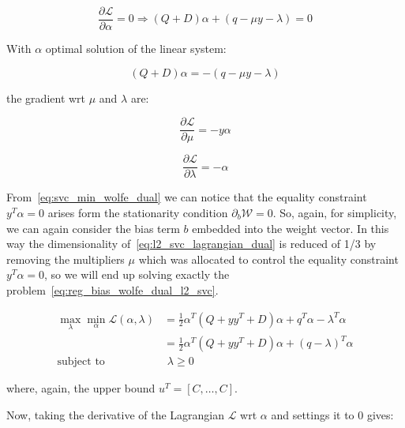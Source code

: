\begin{equation} \label{eq:l2_svc_lagrangian_der_a}
	\frac{\partial \mathcal{L}}{\partial \alpha}=0\Rightarrow (Q+D) \alpha + (q - \mu y - \lambda) = 0
\end{equation}

With $\alpha$ optimal solution of the linear system:

\begin{equation} \label{eq:l2_svc_lagrangian_sol}
    (Q+D) \alpha = - (q - \mu y - \lambda)
\end{equation}

the gradient wrt $\mu$ and $\lambda$ are:

\begin{equation} \label{eq:l2_svc_lagrangian_der_mu}
	\frac{\partial \mathcal{L}}{\partial \mu}=-y \alpha
\end{equation}

\begin{equation} \label{eq:l2_svc_lagrangian_der_lambda}
    \frac{\partial \mathcal{L}}{\partial \lambda}=-\alpha
\end{equation}

From~\eqref{eq:svc_min_wolfe_dual} we can notice that the equality constraint $y^T \alpha = 0$ arises form the stationarity condition $\partial_{{b}} \mathcal{W}=0$. So, again, for simplicity, we can again consider the bias term $b$ embedded into the weight vector. In this way the dimensionality of~\eqref{eq:l2_svc_lagrangian_dual} is reduced of 1/3 by removing the multipliers $\mu$ which was allocated to control the equality constraint $y^T \alpha=0$, so we will end up solving exactly the problem~\eqref{eq:reg_bias_wolfe_dual_l2_svc}.

\begin{equation} \label{eq:l2_svc_lb_lagrangian_dual}
	\begin{aligned}
    	\max_{\lambda} \min_{\alpha} \mathcal{L}(\alpha,\lambda) &= \frac{1}{2} \alpha^T (Q + yy^T + D) \alpha+q^T\alpha - \lambda^T \alpha \\
    &= \frac{1}{2} \alpha^T (Q + yy^T + D) \alpha + (q - \lambda)^T \alpha \\
    \text{subject to} \quad & \,\, \lambda \geq 0
	\end{aligned}
\end{equation}

where, again, the upper bound $u^T = [C, \dots, C]$.

Now, taking the derivative of the Lagrangian $\mathcal{L}$ wrt $\alpha$ and settings it to 0 gives:

